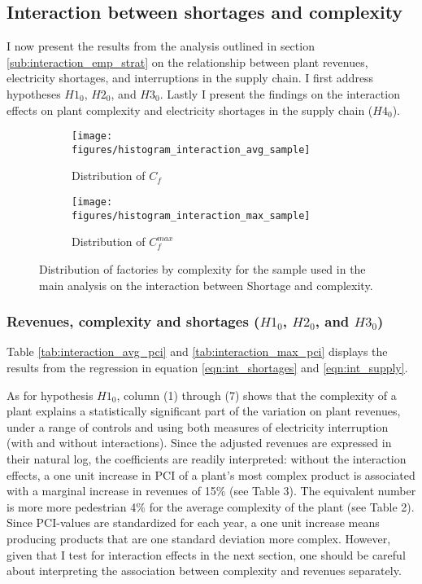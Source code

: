 \documentclass[11pt]{article}
\begin{document}
\subsection{Interaction between shortages and complexity}%
\label{sub:regressions}

I now present the results from the analysis outlined in section \ref{sub:interaction_emp_strat} on the relationship between plant revenues, electricity shortages, and interruptions in the supply chain. I first address hypotheses $H1_0$, $H2_0$, and $H3_0$. Lastly I present the findings on the interaction effects on plant complexity and electricity shortages in the supply chain ($H4_0$).

\begin{figure}
     \centering
     \begin{subfigure}[b]{0.45\textwidth}
         \centering
         \texttt{[image: figures/histogram\_interaction\_avg\_sample]}
	 \caption{Distribution of $C_f$}
         \label{fig:interaction_sample_avg}
     \end{subfigure}
     \hfill
     \begin{subfigure}[b]{0.45\textwidth}
         \centering
         \texttt{[image: figures/histogram\_interaction\_max\_sample]}
	 \caption{Distribution of $C^{max}_{f}$}
         \label{fig:interaction_sample_max}
     \end{subfigure}
     \caption[Distribution of factories by complexity in interaction sample]{Distribution of factories by complexity for the sample used in the main analysis on the interaction between Shortage and complexity.}
        \label{fig:interaction_sample}
\end{figure}

\subsubsection{Revenues, complexity and shortages ($H1_0$, $H2_0$, and $H3_0$)}
\label{sub:h123}
Table \ref{tab:interaction_avg_pci} and \ref{tab:interaction_max_pci} displays the results from the regression in equation \ref{eqn:int_shortages} and \ref{eqn:int_supply}.

As for hypothesis $H1_0$, column (1) through (7) shows that the complexity of a plant explains a statistically significant part of the variation on plant revenues, under a range of controls and using both measures of electricity interruption (with and without interactions). Since the adjusted revenues are expressed in their natural log, the coefficients are readily interpreted: without the interaction effects, a one unit increase in PCI of a plant's most complex product is associated with a marginal increase in revenues of 15\% (see Table 3). The equivalent number is more more pedestrian 4\% for the average complexity of the plant (see Table 2). Since PCI-values are standardized for each year, a one unit increase means producing products that are one standard deviation more complex. However, given that I test for interaction effects in the next section, one should be careful about interpreting the association between complexity and revenues separately. 
\end{document}
